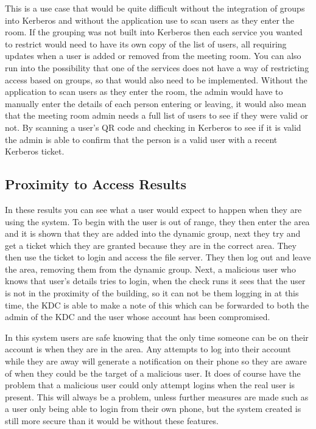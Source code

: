 \documentclass[]{report}   %
\begin{document}
This is a use case that would be quite difficult without the integration of groups into Kerberos and without the application use to scan users as they enter the room. If the grouping was not built into Kerberos then each service you wanted to restrict would need to have its own copy of the list of users, all requiring updates when a user is added or removed from the meeting room. You can also run into the possibility that one of the services does not have a way of restricting access based on groups, so that would also need to be implemented. Without the application to scan users as they enter the room, the admin would have to manually enter the details of each person entering or leaving, it would also mean that the meeting room admin needs a full list of users to see if they were valid or not. By scanning a user's QR code and checking in Kerberos to see if it is valid the admin is able to confirm that the person is a valid user with a recent Kerberos ticket.

\subsection{Proximity to Access Results}
In these results you can see what a user would expect to happen when they are using the system. To begin with the user is out of range, they then enter the area and it is shown that they are added into the dynamic group, next they try and get a ticket which they are granted because they are in the correct area. They then use the ticket to login and access the file server. They then log out and leave the area, removing them from the dynamic group. Next, a malicious user who knows that user's details tries to login, when the check runs it sees that the user is not in the proximity of the building, so it can not be them logging in at this time, the KDC is able to make a note of this which can be forwarded to both the admin of the KDC and the user whose account has been compromised.

In this system users are safe knowing that the only time someone can be on their account is when they are in the area. Any attempts to log into their account while they are away will generate a notification on their phone so they are aware of when they could be the target of a malicious user. It does of course have the problem that a malicious user could only attempt logins when the real user is present. This will always be a problem, unless further measures are made such as a user only being able to login from their own phone, but the system created is still more secure than it would be without these features.
\end{document}
